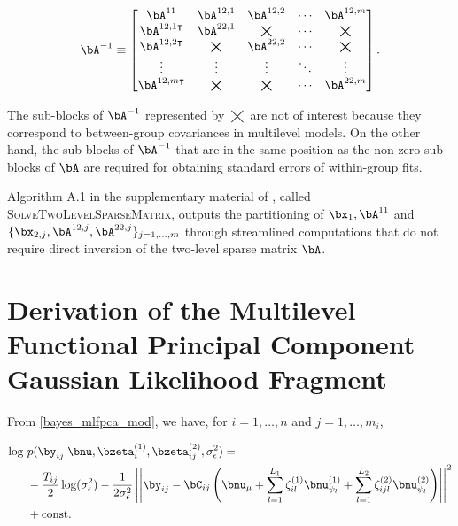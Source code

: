 \documentclass[12pt]{article}
\theoremstyle{plain}
\theoremstyle{definition}
\theoremstyle{remark}
\def\sigsqeps{\sigma^2_{\epsilon}}
\def\const{\text{const.}}
\def\numu{\bnu_\mu}
\newcommand\zetaL[2]{\zeta^{(#1)}_{#2}}
\newcommand\bzetaL[2]{\bzeta^{(#1)}_{#2}}
\newcommand\nupsiL[2]{\bnu^{(#1)}_{\psi_{#2}}}
\begin{document}
\begin{equation}
	\bA^{-1} \equiv \begin{bmatrix}
		\bA^{11} & \bA^{12, 1} & \bA^{12, 2} & \cdots & \bA^{12, m} \\
		\bA^{12, 1 \intercal} & \bA^{22, 1} & \bigtimes & \cdots & \bigtimes \\
		\bA^{12, 2 \intercal} & \bigtimes & \bA^{22, 2} & \cdots & \bigtimes \\
		\vdots & \vdots & \vdots& \ddots & \vdots \\
		\bA^{12, m \intercal} & \bigtimes & \bigtimes & \cdots & \bA^{22, m}
	\end{bmatrix}.
\label{A_inv}
\end{equation}

\noindent The sub-blocks of $\bA^{-1}$ represented by $\bigtimes$ are not of interest because
they correspond to between-group covariances in multilevel models. On the other hand, the
sub-blocks of $\bA^{-1}$ that are in the same position as the non-zero sub-blocks of $\bA$
are required for obtaining standard errors of within-group fits.

Algorithm A.1 in the supplementary material of \citet{nolanmw20}, called
\textsc{SolveTwoLevelSparseMatrix}, outputs the partitioning of $\bx_1, \bA^{11}$ and
$\{ \bx_{2, j}, \bA^{12, j}, \bA^{22, j} \}_{j = 1, \dots, m}$ through streamlined
computations that do not require direct inversion of the two-level sparse matrix $\bA$.


\section{Derivation of the Multilevel Functional Principal Component Gaussian Likelihood Fragment}
\label{app:mlfpca_gauss_lik_frag}

From \eqref{bayes_mlfpca_mod}, we have, for $i = 1, \dots, n$ and $j = 1, \dots, m_i$, 

\begin{align}
\begin{split}
	\log\ &p (\by_{ij} | \bnu, \bzetaL{1}{i}, \bzetaL{2}{ij}, \sigsqeps) = \\
		&-\frac{T_{ij}}{2} \log (\sigsqeps)
		- \frac{1}{2\sigsqeps} \left|\left|
			\by_{ij} - \bC_{ij} \left(
				\numu
				+ \sum_{l=1}^{L_1} \zetaL{1}{il} \nupsiL{1}{l}
				+ \sum_{l=1}^{L_2} \zetaL{2}{ijl} \nupsiL{2}{l}
			\right)
		\right|\right|^2 \\
		&+ \const
\end{split}
\label{log_bayes_mlfpca_mod}
\end{align}
\end{document}
